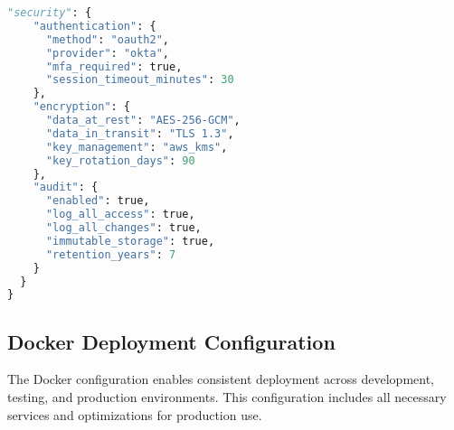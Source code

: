 \documentclass[11pt,a4paper]{article}
\begin{document}
\begin{lstlisting}[language=Python, caption=Master CPF Configuration]
  "security": {
    "authentication": {
      "method": "oauth2",
      "provider": "okta",
      "mfa_required": true,
      "session_timeout_minutes": 30
    },
    "encryption": {
      "data_at_rest": "AES-256-GCM",
      "data_in_transit": "TLS 1.3",
      "key_management": "aws_kms",
      "key_rotation_days": 90
    },
    "audit": {
      "enabled": true,
      "log_all_access": true,
      "log_all_changes": true,
      "immutable_storage": true,
      "retention_years": 7
    }
  }
}
\end{lstlisting}

\subsection{Docker Deployment Configuration}

The Docker configuration enables consistent deployment across development, testing, and production environments. This configuration includes all necessary services and optimizations for production use.
\end{document}
